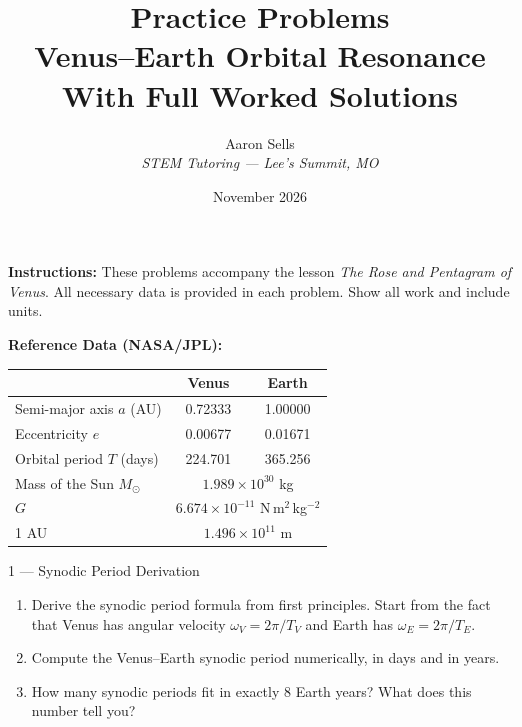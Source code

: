 \documentclass[11pt,letterpaper]{article}
\title{%
  \vspace{-1cm}
  {\Huge\bfseries Practice Problems}\\[6pt]
  {\Large Venus–Earth Orbital Resonance}\\[4pt]
  {\normalsize With Full Worked Solutions}
}
\author{Aaron Sells \\ \textit{STEM Tutoring — Lee's Summit, MO}}
\date{November 2026}
\begin{document}
\maketitle
\thispagestyle{fancy}

\noindent\textbf{Instructions:} These problems accompany the lesson
\textit{The Rose and Pentagram of Venus}. All necessary data is
provided in each problem. Show all work and include units.

\bigskip
\noindent\textbf{Reference Data (NASA/JPL):}
\begin{center}
\begin{tabular}{lcc}
  \toprule
  & \textbf{Venus} & \textbf{Earth} \\
  \midrule
  Semi-major axis $a$ (AU) & 0.72333 & 1.00000 \\
  Eccentricity $e$         & 0.00677 & 0.01671 \\
  Orbital period $T$ (days) & 224.701 & 365.256 \\
  Mass of the Sun $M_\odot$ & \multicolumn{2}{c}{$1.989 \times 10^{30}$ kg} \\
  $G$ & \multicolumn{2}{c}{$6.674 \times 10^{-11}$ N\,m$^2$\,kg$^{-2}$} \\
  1 AU & \multicolumn{2}{c}{$1.496 \times 10^{11}$ m} \\
  \bottomrule
\end{tabular}
\end{center}

\vspace{1cm}

\begin{problem}{1 — Synodic Period Derivation}
\begin{enumerate}[label=(\alph*)]
  \item Derive the synodic period formula from first principles.
    Start from the fact that Venus has angular velocity
    $\omega_V = 2\pi/T_V$ and Earth has $\omega_E = 2\pi/T_E$.
  \item Compute the Venus–Earth synodic period numerically, in days
    and in years.
  \item How many synodic periods fit in exactly 8 Earth years?
    What does this number tell you?
\end{enumerate}
\end{problem}
\end{document}
